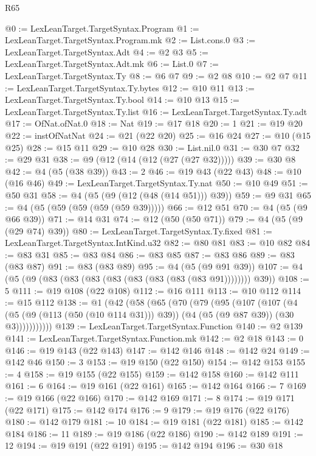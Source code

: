\begin{lexlean}{R65}
\begin{coremodule}
@0 := LexLeanTarget.TargetSyntax.Program
@1 := LexLeanTarget.TargetSyntax.Program.mk
@2 := List.cons.{0}
@3 := LexLeanTarget.TargetSyntax.Adt
@4 := @2 @3
@5 := LexLeanTarget.TargetSyntax.Adt.mk
@6 := List.{0}
@7 := LexLeanTarget.TargetSyntax.Ty
@8 := @6 @7
@9 := @2 @8
@10 := @2 @7
@11 := LexLeanTarget.TargetSyntax.Ty.bytes
@12 := @10 @11
@13 := LexLeanTarget.TargetSyntax.Ty.bool
@14 := @10 @13
@15 := LexLeanTarget.TargetSyntax.Ty.list
@16 := LexLeanTarget.TargetSyntax.Ty.adt
@17 := OfNat.ofNat.{0}
@18 := Nat
@19 := @17 @18
@20 := 1
@21 := @19 @20
@22 := instOfNatNat
@24 := @21 (@22 @20)
@25 := @16 @24
@27 := @10 (@15 @25)
@28 := @15 @11
@29 := @10 @28
@30 := List.nil.{0}
@31 := @30 @7
@32 := @29 @31
@38 := @9 (@12 (@14 (@12 (@27 (@27 @32)))))
@39 := @30 @8
@42 := @4 (@5 (@38 @39))
@43 := 2
@46 := @19 @43 (@22 @43)
@48 := @10 (@16 @46)
@49 := LexLeanTarget.TargetSyntax.Ty.nat
@50 := @10 @49
@51 := @50 @31
@58 := @4 (@5 (@9 (@12 (@48 (@14 @51))) @39))
@59 := @9 @31
@65 := @4 (@5 (@59 (@59 (@59 (@59 @39)))))
@66 := @12 @51
@70 := @4 (@5 (@9 @66 @39))
@71 := @14 @31
@74 := @12 (@50 (@50 @71))
@79 := @4 (@5 (@9 (@29 @74) @39))
@80 := LexLeanTarget.TargetSyntax.Ty.fixed
@81 := LexLeanTarget.TargetSyntax.IntKind.u32
@82 := @80 @81
@83 := @10 @82
@84 := @83 @31
@85 := @83 @84
@86 := @83 @85
@87 := @83 @86
@89 := @83 (@83 @87)
@91 := @83 (@83 @89)
@95 := @4 (@5 (@9 @91 @39))
@107 := @4 (@5 (@9 (@83 (@83 (@83 (@83 (@83 (@83 (@83 (@83 @91)))))))) @39))
@108 := 5
@111 := @19 @108 (@22 @108)
@112 := @16 @111
@113 := @10 @112
@114 := @15 @112
@138 := @1
    (@42
      (@58
        (@65
          (@70
            (@79
              (@95
                (@107
                  (@107
                    (@4
                      (@5 (@9 (@113 (@50 (@10 @114 @31))) @39))
                      (@4 (@5 (@9 @87 @39)) (@30 @3)))))))))))
@139 := LexLeanTarget.TargetSyntax.Function
@140 := @2 @139
@141 := LexLeanTarget.TargetSyntax.Function.mk
@142 := @2 @18
@143 := 0
@146 := @19 @143 (@22 @143)
@147 := @142 @146
@148 := @142 @24
@149 := @142 @46
@150 := 3
@153 := @19 @150 (@22 @150)
@154 := @142 @153
@155 := 4
@158 := @19 @155 (@22 @155)
@159 := @142 @158
@160 := @142 @111
@161 := 6
@164 := @19 @161 (@22 @161)
@165 := @142 @164
@166 := 7
@169 := @19 @166 (@22 @166)
@170 := @142 @169
@171 := 8
@174 := @19 @171 (@22 @171)
@175 := @142 @174
@176 := 9
@179 := @19 @176 (@22 @176)
@180 := @142 @179
@181 := 10
@184 := @19 @181 (@22 @181)
@185 := @142 @184
@186 := 11
@189 := @19 @186 (@22 @186)
@190 := @142 @189
@191 := 12
@194 := @19 @191 (@22 @191)
@195 := @142 @194
@196 := @30 @18

\end{coremodule}
\end{lexlean}
